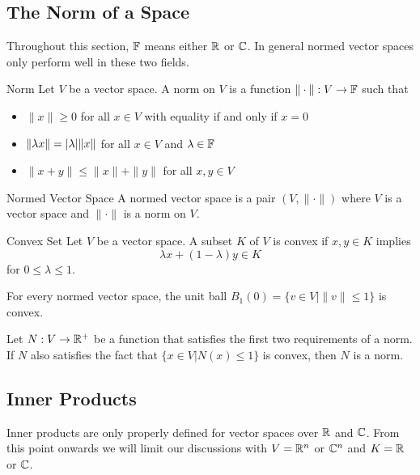\documentclass[a4paper]{article}
\begin{document}
\subsection{The Norm of a Space}
Throughout this section, $\mathbb{F}$ means either $\mathbb{R}$ or $\mathbb{C}$. In general normed vector spaces only perform well in these two fields. 
\begin{defn}{Norm}{} Let $V$ be a vector space. A norm on $V$ is a function $\|\cdot\|:V\to\mathbb{F}$ such that
\begin{itemize}
\item $\|x\|\geq 0$ for all $x\in V$ with equality if and only if $x=0$
\item $\|\lambda x\|=\abs{\lambda}\|x\|$ for all $x\in V$ and $\lambda\in\mathbb{F}$
\item $\|x+y\|\leq\|x\|+\|y\|$ for all $x,y\in V$
\end{itemize}
\end{defn}

\begin{defn}{Normed Vector Space}{} A normed vector space is a pair $(V,\|\cdot\|)$ where $V$ is a vector space and $\|\cdot\|$ is a norm on $V$. 
\end{defn}

\begin{defn}{Convex Set}{} Let $V$ be a vector space. A subset $K$ of $V$ is convex if $x,y\in K$ implies $$\lambda x+(1-\lambda)y\in K$$ for $0\leq\lambda\leq 1$. 
\end{defn}

\begin{lmm}{}{} For every normed vector space, the unit ball $B_1(0)=\{v\in V|\|v\|\leq 1\}$ is convex. 
\end{lmm}

\begin{prp}{}{} Let $N:V\to\mathbb{R}^+$ be a function that satisfies the first two requirements of a norm. If $N$ also satisfies the fact that $\{x\in V|N(x)\leq 1\}$ is convex, then $N$ is a norm. 
\end{prp}

\subsection{Inner Products}
Inner products are only properly defined for vector spaces over $\mathbb{R}$ and $\mathbb{C}$. From this point onwards we will limit our discussions with $V=\mathbb{R}^n$ or $\mathbb{C}^n$ and $K=\mathbb{R}$ or $\mathbb{C}$. 
\end{document}
